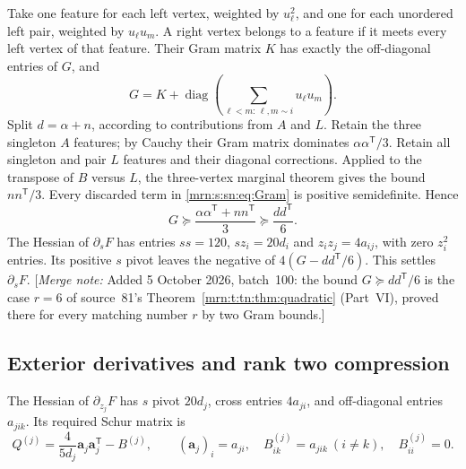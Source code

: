 \documentclass[11pt,a4paper]{article}
\theoremstyle{remark}\newtheorem{remark}[theorem]{Remark}
\newcommand{\mnote}[1]{[\textit{Merge note:} #1]}
\begin{document}
Take one feature for each left vertex, weighted by $u_\ell^2$, and one for
each unordered left pair, weighted by $u_\ell u_m$. A right vertex belongs to
a feature if it meets every left vertex of that feature. Their Gram matrix
$K$ has exactly the off-diagonal entries of $G$, and
\begin{equation}\label{mrn:s:sn:eq:Gram}
 G=K+\operatorname{diag}\left(
       \sum_{\ell<m:\,\ell,m\sim i}u_\ell u_m\right).
\end{equation}
Split $d=\alpha+n$, according to contributions from $A$ and $L$.
Retain the three singleton $A$ features; by Cauchy their Gram matrix dominates
$\alpha\alpha^{\mathsf T}/3$. Retain all singleton and pair $L$ features and
their diagonal corrections. Applied to the transpose of $B$ versus $L$,
the three-vertex marginal theorem gives the bound $nn^{\mathsf T}/3$.
Every discarded term in \eqref{mrn:s:sn:eq:Gram} is positive semidefinite. Hence
\begin{equation}\label{mrn:s:sn:eq:firstGram}
 G\succeq\frac{\alpha\alpha^{\mathsf T}+nn^{\mathsf T}}3
       \succeq\frac{dd^{\mathsf T}}6.
\end{equation}
The Hessian of $\partial_sF$ has entries $ss=120$, $sz_i=20d_i$ and
$z_iz_j=4a_{ij}$, with zero $z_i^2$ entries. Its positive $s$ pivot leaves the
negative of $4(G-dd^{\mathsf T}/6)$. This settles $\partial_sF$.
\mnote{Added 5 October 2026, batch~100: the bound $G\succeq dd^{\mathsf T}/6$ is the case $r=6$ of
source~81's Theorem~\ref{mrn:t:tn:thm:quadratic} (Part~VI), proved there for
every matching number $r$ by two Gram bounds.}

\subsection{Exterior derivatives and rank two compression}
The Hessian of $\partial_{z_j}F$ has $s$ pivot $20d_j$, cross entries $4a_{ji}$,
and off-diagonal entries $a_{jik}$. Its required Schur matrix is
\begin{equation}\label{mrn:s:sn:eq:rootQ}
 Q^{(j)}=\frac4{5d_j}\mathbf a_j\mathbf a_j^{\mathsf T}-B^{(j)},
 \qquad (\mathbf a_j)_i=a_{ji},\quad
 B^{(j)}_{ik}=a_{jik}\ (i\ne k),\quad B^{(j)}_{ii}=0.
\end{equation}
\end{document}
